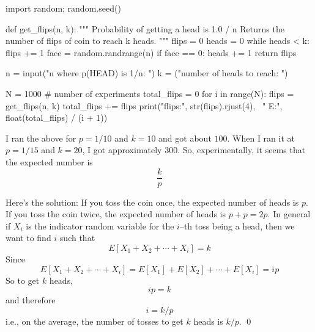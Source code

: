 
{\small
\begin{console}
import random; random.seed()

def get_flips(n, k):
    """
    Probability of getting a head is 1.0 / n
    Returns the number of flips of coin to reach k heads.
    """
    flips = 0
    heads = 0
    while heads < k:
        flips += 1
        face = random.randrange(n)
        if face == 0:
            heads += 1
    return flips

n = input("n where p(HEAD) is 1/n: ")
k = ("number of heads to reach: ")

N = 1000 # number of experiments
total_flips = 0
for i in range(N):
    flips = get_flips(n, k)
    total_flips += flips
    print("flips:", str(flips).rjust(4), \
          " E:", float(total_flips) / (i + 1))
\end{console}
}

I ran the above for $p = 1/10$ and $k = 10$ and got about $100$.
When I ran it at $p = 1/15$ and $k = 20$, I got approximately $300$.
So, experimentally, it seems that the expected number is
\[
\frac{k}{p}
\]

Here's the solution:
If you toss the coin once, the expected number of heads is $p$.
If you toss the coin twice, the expected number of heads is $p + p = 2p$.
In general if $X_i$ is the indicator
random variable for the $i$--th toss being a head,
then we want to find $i$ such that
\[
E[X_1 + X_2 + \cdots + X_i] = k
\]
Since
\[
E[X_1 + X_2 + \cdots + X_i] = E[X_1] + E[X_2] + \cdots + E[X_i] = ip
\]
So to get $k$ heads,
\[
ip = k
\]
and therefore
\[
i = k/p
\]
i.e., on the average, the number of tosses to get $k$ heads
is $k/p$. \qed

    
